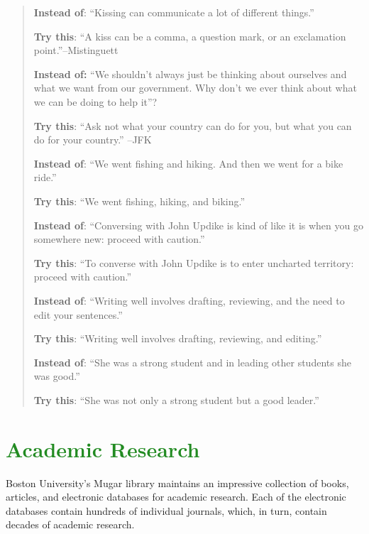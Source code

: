 \documentclass[12pt, hidelinks]{article} %
\begin{document}
\begin{quote}
\textbf{Instead of}: ``Kissing can communicate a lot of different things.''

\textbf{ Try this}: ``A kiss can be a comma, a question mark, or an exclamation 
                   point.''--Mistinguett

\textbf{Instead of:} ``We shouldn't always just be thinking about ourselves and what we want from our
                  	government. Why don't we ever think about what we can be doing to help it''?

  \textbf{	Try this}: ``Ask not what your country can do for you, but what you can do for your
                               country.'' --JFK

\textbf{Instead of}: ``We went fishing and hiking. And then we went for a bike ride.''

\textbf{	Try this}: ``We went fishing, hiking, and biking.''

\textbf{Instead of}: ``Conversing with John Updike is kind of like it is when you go somewhere new:
                    proceed with caution.''

	\textbf{Try this}: ``To converse with John Updike is to enter uncharted territory: proceed with
                              caution.''

\textbf{Instead of}:  ``Writing well involves drafting, reviewing, and the need to edit your sentences.''
 
	\textbf{Try this}: ``Writing well involves drafting, reviewing, and editing.''

\textbf{Instead of}: ``She was a strong student and in leading other students she was good.''

\textbf{Try this}: ``She was not only a strong student but a good leader.''
 \end{quote}


\section{\textcolor{ForestGreen}{Academic Research}}

Boston University's Mugar library maintains an impressive collection of books, articles, and electronic databases for academic research. Each of the electronic databases contain hundreds of individual journals, which, in turn, contain decades of academic research.
\end{document}

